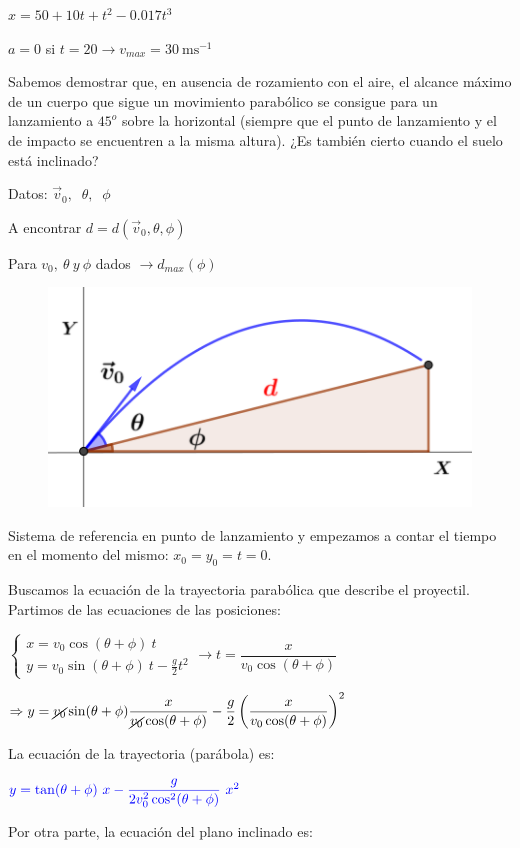 $x=50+10t+t^2-0.017t^3$

$a=0$ si $t=20 \to v_{max}=30\ \mathrm{ms}^{-1}$	

\begin{prob}
Sabemos demostrar que, en ausencia de rozamiento con el aire, el alcance máximo de un cuerpo que sigue un movimiento parabólico se consigue para un lanzamiento a $45^o$ sobre la horizontal (siempre que el punto de lanzamiento y el de impacto se encuentren a la misma altura). ¿Es también cierto cuando el suelo está inclinado? 
\end{prob}
\begin{multicols}{2}
Datos: $\vec v_0,\;\; \theta,\;\; \phi$

A encontrar $d=d(\vec v_0,\theta,\phi)$

Para $v_0, \ \theta \ { y }\  \phi$ dados $\to d_{max}(\phi)$
\begin{figure}[H]
		\centering
		\includegraphics[width=.5\textwidth]{imagenes/imagenes02/T02IM36.png}
		\end{figure}
\end{multicols}

Sistema de referencia en punto de lanzamiento y empezamos a contar el tiempo en el momento del mismo: $x_0=y_0=t=0$.

Buscamos la ecuación de la trayectoria parabólica que describe el proyectil. Partimos de las ecuaciones de las posiciones:

$\begin{cases} x=v_0 \cos (\theta+\phi) \ t \\ y=v_0 \sin (\theta+\phi) \ t - \frac g 2 t^2 \end{cases}  \to t=\dfrac x{v_0 \cos (\theta+\phi)} $

$\Rightarrow y=\cancel{v_0} \sin (\theta+\phi) \dfrac x{\cancel{v_0} \cos (\theta+\phi)} - \dfrac g 2 \left( \dfrac x{v_0 \cos (\theta+\phi)}  \right)^2$

La ecuación de la trayectoria (parábola) es:

$\textcolor{blue}{y=\tan(\theta+\phi) \ x - \dfrac {g}{2 v_0^2 \cos^2 (\theta+\phi)}\ x^2}$

Por otra parte, la ecuación del plano inclinado es:

